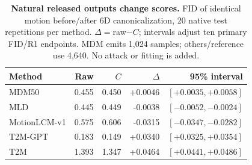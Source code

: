 \begin{table}[t]
\centering\footnotesize
\caption{\textbf{Natural released outputs change scores.} FID of identical motion before/after 6D canonicalization, 20 native test repetitions per method. $\Delta=$raw$-C$; intervals adjust ten primary FID/R1 endpoints. MDM emits 1,024 samples; others/reference use 4,640. No attack or fitting is added.}
\label{tab:releases}
\begin{tabular}{@{}lrrrr@{}}\toprule
Method&Raw&$C$&$\Delta$&95\% interval\\\midrule
MDM50&0.455&0.450&+0.0046&$[+0.0035,+0.0058]$\\
MLD&0.445&0.449&-0.0038&$[-0.0052,-0.0024]$\\
MotionLCM-v1&0.575&0.606&-0.0315&$[-0.0347,-0.0282]$\\
T2M-GPT&0.183&0.149&+0.0340&$[+0.0325,+0.0354]$\\
T2M&1.393&1.347&+0.0464&$[+0.0441,+0.0486]$\\
\bottomrule\end{tabular}\end{table}
